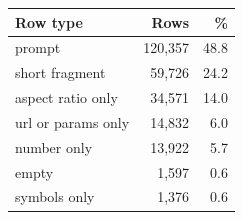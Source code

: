 \begin{tabular}{lrr}
\toprule
Row type & Rows & \% \\
\midrule
prompt & 120,357 & 48.8 \\
short fragment & 59,726 & 24.2 \\
aspect ratio only & 34,571 & 14.0 \\
url or params only & 14,832 & 6.0 \\
number only & 13,922 & 5.7 \\
empty & 1,597 & 0.6 \\
symbols only & 1,376 & 0.6 \\
\bottomrule
\end{tabular}
